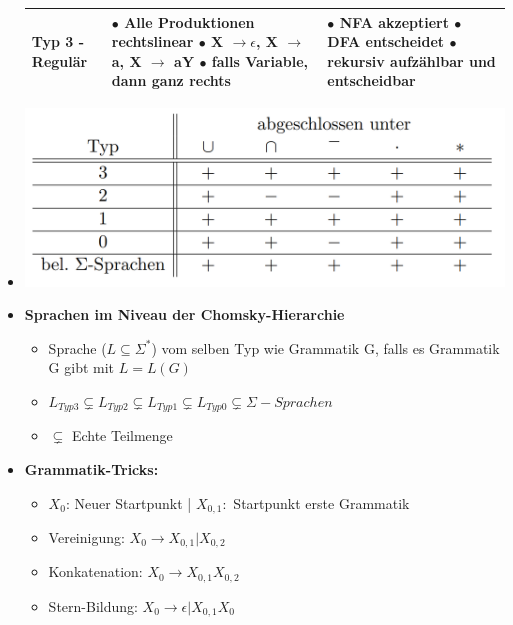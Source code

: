 \documentclass[11pt,a4paper]{article}
\begin{document}
\begin{itemize}
\begin{longtable}[h]{|p{4cm} | p{6cm} | p{7cm}|}
Typ 3 - Regulär &  \makecell[l]{$\bullet$ Alle Produktionen rechtslinear \\
$\bullet$ X $\rightarrow \epsilon$, X $\rightarrow$ a, X $\rightarrow$ aY \\
$\bullet$ falls Variable, dann ganz rechts} &
\makecell[l]{$\bullet$ NFA akzeptiert \\ $\bullet$ DFA entscheidet \\$\bullet$ rekursiv aufzählbar und entscheidbar} \\ \hline

\end{longtable}

\item[]
	\begin{center}
	\includegraphics[width=14cm]{abschlussgrammatiken}
	\end{center}
	
\item \textbf{Sprachen im Niveau der Chomsky-Hierarchie}
	\begin{itemize}
	
	\item Sprache ($L \subseteq \Sigma^*$)	vom selben Typ wie Grammatik G, falls es Grammatik G gibt mit $L = L(G)$
	\item $L_{Typ3} \subsetneq L_{Typ2} \subsetneq L_{Typ1} \subsetneq L_{Typ0} \subsetneq \Sigma-Sprachen$
	\item $\subsetneq$ Echte Teilmenge
	
	\end{itemize}
	
\item \textbf{Grammatik-Tricks:}
	\begin{itemize}
	\item $X_0$: Neuer Startpunkt | $X_{0,1}:$ Startpunkt erste Grammatik
	\item Vereinigung: $X_0 \rightarrow X_{0,1} | X_{0,2}$
	\item Konkatenation: $X_0 \rightarrow X_{0,1} X_{0,2}$
	\item Stern-Bildung: $X_0 \rightarrow \epsilon|X_{0,1}X_0$ 
	\end{itemize}
	

\end{itemize}
\end{document}
